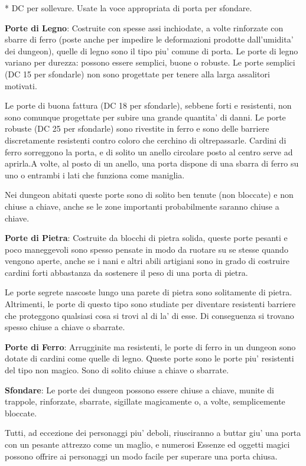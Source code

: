 \documentclass[a4paper,11pt,twoside,openany]{book}
\begin{document}
{{*} DC per sollevare. Usate la voce appropriata di porta per sfondare.

\bigskip

\textbf{Porte di Legno}: Costruite con spesse assi inchiodate, a volte rinforzate con sbarre di ferro (poste anche per impedire le deformazioni prodotte dall'umidita' dei dungeon), quelle di legno sono il tipo piu' comune di porta. Le porte di legno variano per durezza: possono essere semplici, buone o robuste. Le porte semplici (DC 15 per sfondarle) non sono progettate per tenere alla larga assalitori motivati.

Le porte di buona fattura (DC 18 per sfondarle), sebbene forti e resistenti, non sono comunque progettate per subire una grande quantita' di danni. Le porte robuste (DC 25 per sfondarle) sono rivestite in ferro e sono delle barriere discretamente resistenti contro coloro che cerchino di oltrepassarle. Cardini di ferro sorreggono la porta, e di solito un anello circolare posto al centro serve ad aprirla.A volte, al posto di un anello, una porta dispone di una sbarra di ferro su uno o entrambi i lati che funziona come maniglia.

Nei dungeon abitati queste porte sono di solito ben tenute (non bloccate) e non chiuse a chiave, anche se le zone importanti probabilmente saranno chiuse a chiave.

\textbf{Porte di Pietra}: Costruite da blocchi di pietra solida, queste porte pesanti e poco maneggevoli sono spesso pensate in modo da ruotare su se stesse quando vengono aperte, anche se i nani e altri abili artigiani sono in grado di costruire cardini forti abbastanza da sostenere il peso di una porta di pietra.

Le porte segrete nascoste lungo una parete di pietra sono solitamente di pietra. Altrimenti, le porte di questo tipo sono studiate per diventare resistenti barriere che proteggono qualsiasi cosa si trovi al di la' di esse. Di conseguenza si trovano spesso chiuse a chiave o sbarrate.

\textbf{Porte di Ferro}: Arrugginite ma resistenti, le porte di ferro in un dungeon sono dotate di cardini come quelle di legno. Queste porte sono le porte piu' resistenti del tipo non magico. Sono di solito chiuse a chiave o sbarrate.

\textbf{Sfondare}: Le porte dei dungeon possono essere chiuse a chiave, munite di trappole, rinforzate, sbarrate, sigillate magicamente o, a volte, semplicemente bloccate.

Tutti, ad eccezione dei personaggi piu' deboli, riusciranno a buttar giu' una porta con un pesante attrezzo come un maglio, e numerosi Essenze ed oggetti magici possono offrire ai personaggi un modo facile per superare una porta chiusa.

}
\end{document}
